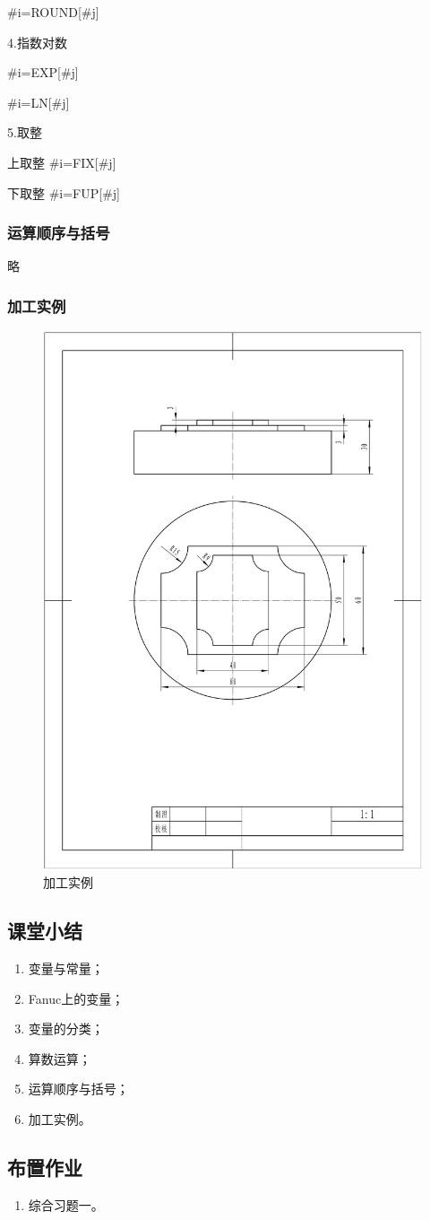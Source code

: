 \#i=ROUND[\#j]

4.指数对数

\#i=EXP[\#j]

\#i=LN[\#j]

5.取整

上取整  \#i=FIX[\#j]

下取整  \#i=FUP[\#j]

\subsubsection{运算顺序与括号}

略

\subsubsection{加工实例}

\begin{figure}[h]
	\centering
	\includegraphics[width=0.7\linewidth,trim=0 0 0 0,clip]{data/image/33-1}
	\caption{加工实例}
	\label{fig:33-1}
\end{figure}

\subsection{课堂小结}
\begin{enumerate}[1、]
\item 变量与常量；
\item Fanuc上的变量；
\item 变量的分类；
\item 算数运算；
\item 运算顺序与括号；
\item 加工实例。
\end{enumerate}

\vfill
\subsection{布置作业}
\begin{enumerate}[1、]
	\item 综合习题一。
\end{enumerate}
\vfill